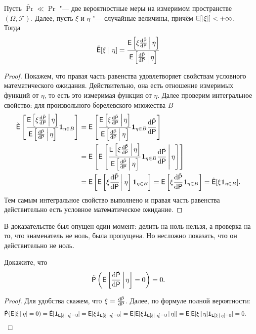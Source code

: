 \begin{theorem}
	Пусть $\tilde{\Pr} \ll \Pr$ "--- две вероятностные меры на измеримом пространстве $(\Omega, \mathcal{F})$. Далее, пусть $\xi$ и $\eta$ "--- случайные величины, причём $\operatorname{\mathsf{E}}[|\xi|] < +\infty$. Тогда
	\[
		\tilde{\operatorname{\mathsf{E}}}[\xi \mid \eta] = \frac{\operatorname{\mathsf{E}}\left[\xi \dv{\tilde{\mathsf{P}}}{\mathsf{P}}\,\middle|\,\eta\right]}{\operatorname{\mathsf{E}}\left[\dv{\tilde{\mathsf{P}}}{\mathsf{P}}\,\middle|\,\eta\right]}
	\]
\end{theorem}
\begin{proof}
	Покажем, что правая часть равенства удовлетворяет свойствам условного математического ожидания. Действительно, она есть отношение измеримых функций от $\eta$, то есть это измеримая функция от $\eta$. Далее проверим интегральное свойство: для произвольного борелевского множества $B$
	\begin{align*}
		\tilde{\operatorname{\mathsf{E}}}\left[\frac{\operatorname{\mathsf{E}}\left[\xi \dv{\tilde{\mathsf{P}}}{\mathsf{P}}\,\middle|\,\eta\right]}{\operatorname{\mathsf{E}}\left[\dv{\tilde{\mathsf{P}}}{\mathsf{P}}\,\middle|\,\eta\right]}\mathbf{1}_{\eta \in B}\right]
		&= \operatorname{\mathsf{E}}\left[\frac{\operatorname{\mathsf{E}}\left[\xi \dv{\tilde{\mathsf{P}}}{\mathsf{P}}\,\middle|\,\eta\right]}{\operatorname{\mathsf{E}}\left[\dv{\tilde{\mathsf{P}}}{\mathsf{P}}\,\middle|\,\eta\right]}\mathbf{1}_{\eta \in B}\dv{\tilde{\mathsf{P}}}{\mathsf{P}}\right] \\
		&= \operatorname{\mathsf{E}}\left[\operatorname{\mathsf{E}}\left[\frac{\operatorname{\mathsf{E}}\left[\xi \dv{\tilde{\mathsf{P}}}{\mathsf{P}}\,\middle|\,\eta\right]}{\operatorname{\mathsf{E}}\left[\dv{\tilde{\mathsf{P}}}{\mathsf{P}}\,\middle|\,\eta\right]}\mathbf{1}_{\eta \in B}\dv{\tilde{\mathsf{P}}}{\mathsf{P}} \,\middle|\, \eta\right]\right] \\
		&= \operatorname{\mathsf{E}}\left[\operatorname{\mathsf{E}}\left[\xi \dv{\tilde{\mathsf{P}}}{\mathsf{P}}\,\middle|\,\eta\right]\mathbf{1}_{\eta \in B}\right]
		= \operatorname{\mathsf{E}}\left[\xi \dv{\tilde{\mathsf{P}}}{\mathsf{P}}\mathbf{1}_{\eta \in B}\right]
		= \tilde{\operatorname{\mathsf{E}}}[\xi\mathbf{1}_{\eta \in B}].
	\end{align*}
	Тем самым интегральное свойство выполнено и правая часть равенства действительно есть условное математическое ожидание.
\end{proof}

В доказательстве был опущен один момент: делить на ноль нельзя, а проверка на то, что знаменатель не ноль, была пропущена. Но несложно показать, что он действительно не ноль.
\begin{problem}
    Докажите, что 
    \[
        \tilde{\mathsf{P}}\left(\operatorname{\mathsf{E}}\left[\dv{\tilde{\mathsf{P}}}{\mathsf{P}}\,\middle|\, \eta\right] = 0\right) = 0.
    \]
\end{problem}
\begin{proof}
    Для удобства скажем, что $\xi = \dv{\tilde{\mathsf{P}}}{\mathsf{P}}$. Далее, по формуле полной вероятности:
    \begin{align*}
        \tilde{\mathsf{P}}(\operatorname{\mathsf{E}}[\xi\,|\, \eta] = 0)
        &= \tilde{\operatorname{\mathsf{E}}}[\bm{1}_{\operatorname{\mathsf{E}}[\xi\,|\, \eta] = 0}]
        = \operatorname{\mathsf{E}}[\xi\bm{1}_{\operatorname{\mathsf{E}}[\xi\,|\, \eta] = 0}]
        = \operatorname{\mathsf{E}}[\operatorname{\mathsf{E}}[\xi\bm{1}_{\operatorname{\mathsf{E}}[\xi\,|\, \eta] = 0}\,|\,\eta]]
        = \operatorname{\mathsf{E}}[\operatorname{\mathsf{E}}[\xi\,|\,\eta]\bm{1}_{\operatorname{\mathsf{E}}[\xi\,|\, \eta] = 0}]
        = 0. \qedhere
    \end{align*}
\end{proof}